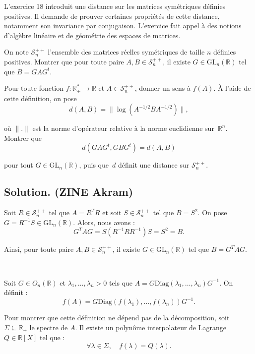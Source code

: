 L'exercice 18 introduit une distance sur les matrices sym{\'e}triques
d{\'e}finies positives. Il demande de prouver certaines propri{\'e}t{\'e}s de
cette distance, notamment son invariance par conjugaison. L'exercice fait
appel {\`a} des notions d'alg{\`e}bre lin{\'e}aire et de g{\'e}om{\'e}trie des
espaces de matrices.
\begin{exercise}
On note $\mathcal{S}^{+ +}_n$ l'ensemble des matrices r{\'e}elles
sym{\'e}triques de taille $n$ d{\'e}finies positives. Montrer que pour toute
paire $A, B \in \mathcal{S}^{+ +}_n$, il existe $G \in \mathrm{GL}_n
(\mathbb{R})$ tel que $B = GAG^t$.

Pour toute fonction $f : \mathbb{R}_+^{\ast} \to \mathbb{R}$ et $A \in
\mathcal{S}^{+ +}_n$, donner un sens {\`a} $f (A)$. {\`A} l'aide de cette
d{\'e}finition, on pose
\[ d (A, B) = \| \log (A^{- 1 / 2} BA^{- 1 / 2})\|, \]


o{\`u} $\|.\|$ est la norme d'op{\'e}rateur relative {\`a} la norme
euclidienne sur~$\mathbb{R}^n$. Montrer que
\[ d (GAG^t, GBG^t) = d (A, B) \]


pour tout $G \in \mathrm{GL}_n (\mathbb{R})$, puis que~$d$ d{\'e}finit une
distance sur $\mathcal{S}^{+ +}_n$.
\end{exercise}

\subsection*{Solution. (ZINE Akram)}

Soit $R \in \mathcal{S}^{+ +}_n$ tel que $A = R^T R$ et soit $S \in
\mathcal{S}^{+ +}_n$ tel que $B = S^2$. On pose $G = R^{- 1} S \in \text{GL}_n
(\mathbb{R})$. Alors, nous avons :
\[ G^T AG = S (R^{- 1} RR^{- 1}) S = S^2 = B. \]


Ainsi, pour toute paire $A, B \in \mathcal{S}^{+ +}_n$, il existe $G \in
\text{GL}_n (\mathbb{R})$ tel que $B = G^T AG$.

\

Soit $G \in O_n (\mathbb{R})$ et $\lambda_1, \ldots, \lambda_n > 0$ tels que
$A = G \text{Diag} (\lambda_1, \ldots, \lambda_n) G^{- 1}$. On d{\'e}finit :
\[ f (A) = G \text{Diag} (f (\lambda_1), \ldots, f (\lambda_n)) G^{- 1} . \]


Pour montrer que cette d{\'e}finition ne d{\'e}pend pas de la
d{\'e}composition, soit $\Sigma \subseteq \mathbb{R}_+$ le spectre de $A$. Il
existe un polyn{\^o}me interpolateur de Lagrange $Q \in \mathbb{R}[X]$ tel que
:
\[ \forall \lambda \in \Sigma, \quad f (\lambda) = Q (\lambda) . \]


